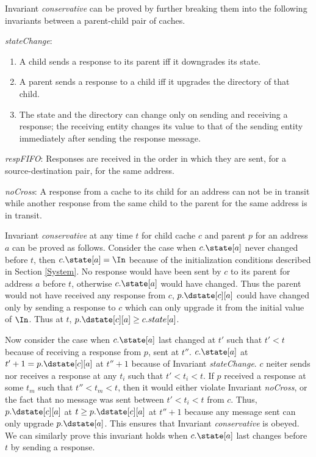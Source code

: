 Invariant \textit{conservative} can be proved by
further breaking them into the following invariants between a parent-child pair
of caches.

\begin{inv}
\textit{stateChange}:
\begin{enumerate}
\item A child sends a response to its parent iff it downgrades its state.
\item A parent sends a response to a child iff it upgrades the directory of
that child.
\item The state and the directory can change only on sending and receiving a
response; the receiving entity changes its value to that of the sending entity
immediately after sending the response message.
\end{enumerate}
\label{stateChange}
\end{inv}

\begin{inv}
\textit{respFIFO}: Responses are received in the order in which they are sent,
for a source-destination pair, for the same address.
\label{respFIFO}
\end{inv}

\begin{inv}
\textit{noCross}: A response from a cache to its child for an address can not
be in transit while another response from the same child to the parent for the
same address is in transit.
\label{noCross}
\end{inv}

Invariant \textit{conservative} at any time $t$ for child cache $c$ and parent
$p$ for an address $a$ can be proved as follows. Consider the case when
$c.\state[a]$ never changed before $t$, then $c.\state[a] = \In$ because of the
initialization conditions described in Section \ref{System}. No response would
have been sent by $c$ to its parent for address $a$ before $t$, otherwise
$c.\state[a]$ would have changed. Thus the parent would not have received any
response from $c$, $p.\dstate[c][a]$ could have changed only by sending a
response to $c$ which can only upgrade it from the initial value of $\In$. Thus
at $t$, $p.\dstate[c][a] \ge c.state[a]$.

Now consider the case when $c.\state[a]$ last changed at $t'$ such that $t' <
t$ because of receiving a response from $p$, sent at $t''$. $c.\state[a]$ at
$t'+1 = p.\dstate[c][a]$ at $t''+1$ because of Invariant \textit{stateChange}.
$c$ neiter sends nor receives a response at any $t_i$ such that $t' < t_i < t$.
If $p$ received a response at some $t_m$ such that $t'' < t_m < t$,
then it would either violate Invariant \textit{noCross}, or the fact that no
message was sent between $t' < t_i < t$ from $c$. Thus, $p.\dstate[c][a]$ at $t
\ge p.\dstate[c][a]$ at $t''+1$ because any message sent can only upgrade
$p.\dstate[a]$. This ensures that Invariant \textit{conservative} is obeyed. We
can similarly prove this invariant holds when $c.\state[a]$ last changes before
$t$ by sending a response.

